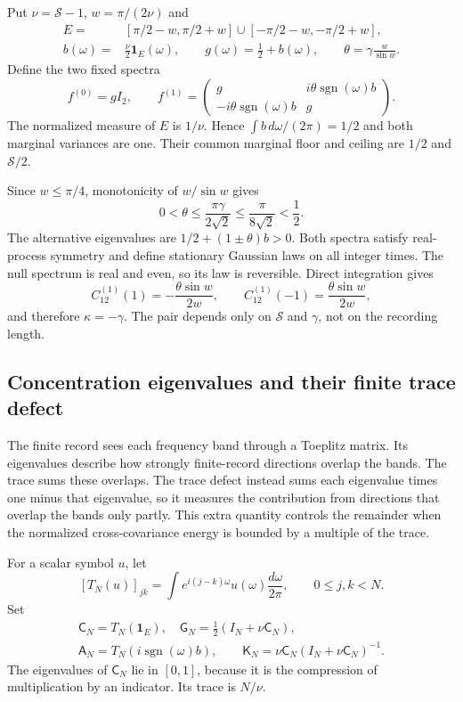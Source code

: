 Put $\nu=\mathcal S-1$, $w=\pi/(2\nu)$ and
\begin{align}
 E={}&[\pi/2-w,\pi/2+w]\cup[-\pi/2-w,-\pi/2+w],\nonumber\\
 b(\omega)={}&\frac\nu2\mathbf1_E(\omega),\qquad
 g(\omega)=\frac12+b(\omega),\qquad
 \theta=\gamma\frac{w}{\sin w}.
 \label{cost16:pair-parameters}
\end{align}
Define the two fixed spectra
\begin{equation}
 f^{(0)}=gI_2,
 \qquad
 f^{(1)}=
 \begin{pmatrix}
 g&i\theta\operatorname{sgn}(\omega)b\\
 -i\theta\operatorname{sgn}(\omega)b&g
 \end{pmatrix}.
 \label{cost16:pair}
\end{equation}
The normalized measure of $E$ is $1/\nu$. Hence $\int b\,d\omega/(2\pi)=1/2$ and both marginal variances are one. Their common marginal floor and ceiling are $1/2$ and $\mathcal S/2$.

Since $w\le\pi/4$, monotonicity of $w/\sin w$ gives
\[
 0<\theta\le\frac{\pi\gamma}{2\sqrt2}
 \le\frac{\pi}{8\sqrt2}<\frac12.
\]
The alternative eigenvalues are $1/2+(1\pm\theta)b>0$. Both spectra satisfy real-process symmetry and define stationary Gaussian laws on all integer times. The null spectrum is real and even, so its law is reversible. Direct integration gives
\[
 C_{12}^{(1)}(1)=-\frac{\theta\sin w}{2w},\qquad
 C_{12}^{(1)}(-1)=\frac{\theta\sin w}{2w},
\]
and therefore $\kappa=-\gamma$. The pair depends only on $\mathcal S$ and $\gamma$, not on the recording length.

\subsection{Concentration eigenvalues and their finite trace defect}

The finite record sees each frequency band through a Toeplitz matrix. Its eigenvalues describe how strongly finite-record directions overlap the bands. The trace sums these overlaps. The trace defect instead sums each eigenvalue times one minus that eigenvalue, so it measures the contribution from directions that overlap the bands only partly. This extra quantity controls the remainder when the normalized cross-covariance energy is bounded by a multiple of the trace.

For a scalar symbol $u$, let
\[
 [T_N(u)]_{jk}=\int e^{i(j-k)\omega}u(\omega)\frac{d\omega}{2\pi},
 \qquad 0\le j,k<N.
\]
Set
\begin{equation}
 \begin{gathered}
 \mathsf C_N=T_N(\mathbf1_E),\quad
 \mathsf G_N=\tfrac12(I_N+\nu\mathsf C_N),\\
 \mathsf A_N=T_N(i\operatorname{sgn}(\omega)b),\qquad
 \mathsf K_N=\nu\mathsf C_N(I_N+\nu\mathsf C_N)^{-1}.
 \end{gathered}
 \label{cost16:matrices}
\end{equation}
The eigenvalues of $\mathsf C_N$ lie in $[0,1]$, because it is the compression of multiplication by an indicator. Its trace is $N/\nu$.

